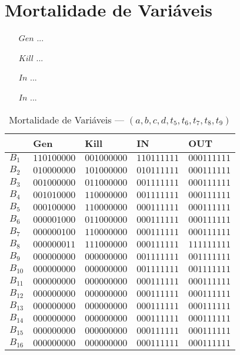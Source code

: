 \section{Mortalidade de Vari\'aveis}

\begin{itemize}
  \item[$Gen$] ...
  \item[$Kill$] ...
  \item[$In$] ...
  \item[$In$] ...
\end{itemize}

\begin{table}[ht]
\centering
\begin{tabular}{l|l|l|l|l}
	& Gen & Kill & IN & OUT\\
\hline
$B_{1}$ &  $110100000$ & $001000000$ & $110111111$ & $000111111$\\
$B_{2}$ &  $010000000$ & $101000000$ & $010111111$ & $000111111$\\
$B_{3}$ &  $001000000$ & $011000000$ & $001111111$ & $000111111$\\
$B_{4}$ &  $001010000$ & $110000000$ & $001111111$ & $000111111$\\
$B_{5}$ &  $000100000$ & $110000000$ & $000111111$ & $000111111$\\
$B_{6}$ &  $000001000$ & $011000000$ & $000111111$ & $000111111$\\
$B_{7}$ &  $000000100$ & $110000000$ & $000111111$ & $000111111$\\
$B_{8}$ &  $000000011$ & $111000000$ & $000111111$ & $111111111$\\
$B_{9}$ &  $000000000$ & $000000000$ & $001111111$ & $001111111$\\
$B_{10}$ &  $000000000$ & $000000000$ & $001111111$ & $001111111$\\
$B_{11}$ &  $000000000$ & $000000000$ & $000111111$ & $000111111$\\
$B_{12}$ &  $000000000$ & $000000000$ & $000111111$ & $000111111$\\
$B_{13}$ &  $000000000$ & $000000000$ & $000111111$ & $000111111$\\
$B_{14}$ &  $000000000$ & $000000000$ & $000111111$ & $000111111$\\
$B_{15}$ &  $000000000$ & $000000000$ & $000111111$ & $000111111$\\
$B_{16}$ &  $000000000$ & $000000000$ & $000111111$ & $000111111$\\
\end{tabular}
\caption{Mortalidade de Vari\'aveis --- $(a, b, c, d, t_{5}, t_{6}, t_{7}, t_{8}, t_{9})$}
\end{table}

